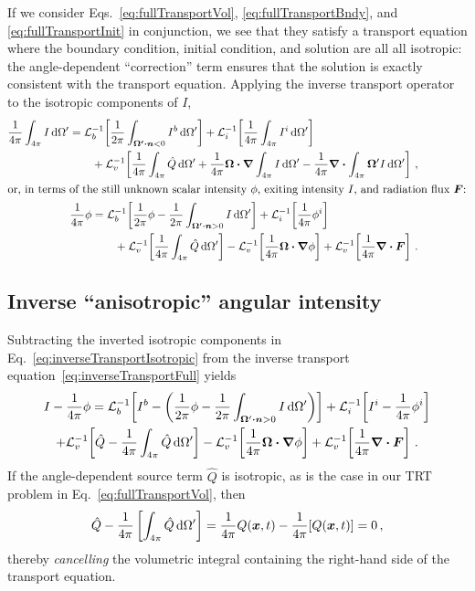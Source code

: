If we consider Eqs.~\eqref{eq:fullTransportVol}, \eqref{eq:fullTransportBndy},
and \eqref{eq:fullTransportInit} in conjunction, we see that they satisfy a
transport equation where the boundary condition, initial condition, and
solution are all all isotropic: the angle-dependent ``correction'' term ensures
that the solution is exactly consistent with the transport equation. Applying
the inverse transport operator to the isotropic components of $I$,
\begin{align} \nonumber
  \begin{split}
 \frac1{4\pi} \int_{4\pi} I \ud \Omega'
 &= \lopinv{b}{ \frac{1}{2\pi} \int_{\vec{\Omega'} \vd \vec{n} < 0}
   I^b \ud \Omega'}
 + \lopinv{i}{ \frac1{4\pi} \int_{4\pi} I^i \ud \Omega'}
 \\&\qquad + \lopinv{v}{
 \frac{1}{4\pi} \int_{4\pi} \hat Q \ud \Omega'
  + \frac1{4\pi} \vec{\Omega} \vd \grad \int_{4\pi} I \ud \Omega'
  - \frac1{4\pi}\grad \vd \int_{4\pi} \vec{\Omega}' I \ud \Omega'
  } \,,
  \end{split}\\ 
  \intertext{or, in terms of the still unknown scalar intensity $\phi$, exiting
  intensity $I$, and radiation flux $\vec{F}$:}
  \label{eq:inverseTransportIsotropic}
  \begin{split}
  \frac1{4\pi} \phi &=  \lopinv{b}{ \frac{1}{2\pi} \phi
 - \frac{1}{2\pi} \int_{\vec{\Omega}' \vd \vec{n} > 0} I \ud
 \Omega'
 }
 + \lopinv{i}{ \frac1{4\pi} \phi^i }
 \\&\qquad
 + \lopinv{v}{ \frac1{4\pi} \int_{4\pi} \hat Q \ud \Omega' }
 - \lopinv{v}{ \frac1{4\pi}\vec{\Omega}\vd \grad \phi }
 + \lopinv{v}{ \frac1{4\pi}\grad \vd \vec{F} }\,.
  \end{split}
\end{align}

\subsection{Inverse ``anisotropic'' angular intensity}
Subtracting the inverted isotropic components in
Eq.~\eqref{eq:inverseTransportIsotropic} from the inverse transport
equation~\eqref{eq:inverseTransportFull} yields
\begin{multline*}
 I - \frac1{4\pi} \phi =
 \mathcal{L}_{b}^{-1}\!\left[I^b - \left( \frac{1}{2\pi} \phi
 - \frac{1}{2\pi} \int_{\bm{\Omega}' \bm{\cdot} \bm{n} > 0} I\mathop{}\!\mathrm{d}\Omega'
 \right)\right]
 + \mathcal{L}_{i}^{-1}\!\left[I^i - \frac1{4\pi} \phi^i\right]
 \\
 + \mathcal{L}_{v}^{-1}\!\left[\hat Q -  \frac1{4\pi} \int_{4\pi} \hat Q \mathop{}\!\mathrm{d} \Omega'\right]
 - \mathcal{L}_{v}^{-1}\!\left[ \frac1{4\pi}\bm{\Omega}\bm{\cdot} \bm{\nabla} \phi \right]
 + \mathcal{L}_{v}^{-1}\!\left[ \frac1{4\pi}\bm{\nabla} \bm{\cdot} \bm{F} \right]\,.
\end{multline*}
If the angle-dependent source term $\hat Q$ is isotropic, as is the case in
our TRT problem in Eq.~\eqref{eq:fullTransportVol}, then 
\begin{equation*}
  \hat Q - \frac1{4\pi} \left[\int_{4\pi} \hat Q \mathop{}\!\mathrm{d} \Omega' \right]
  = \frac{1}{4\pi} Q(\bm{x},t) - \frac1{4\pi} [Q(\bm{x},t)] = 0\,,
\end{equation*}
thereby \emph{cancelling} the volumetric integral containing the right-hand
side of the transport equation.

